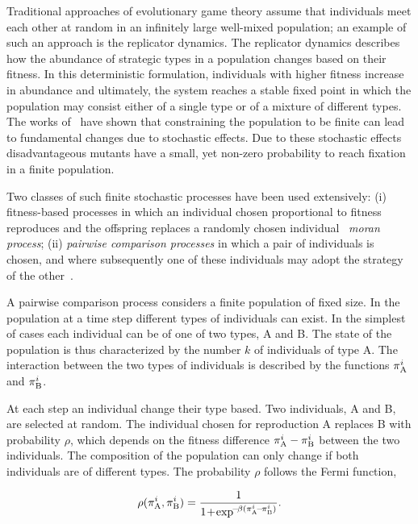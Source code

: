 \documentclass[11pt]{article}
\theoremstyle{plainCl1}
\theoremstyle{plainCl2}
\begin{document}
Traditional approaches of evolutionary game theory assume that individuals meet
each other at random in an infinitely large well-mixed population; an example of
such an approach is the replicator dynamics. The replicator dynamics describes
how the abundance of strategic types in a population changes based on their
fitness. In this deterministic formulation, individuals with higher fitness
increase in abundance and ultimately, the system reaches a stable fixed point in
which the population may consist either of a single type or of a mixture of
different types. The works of~\cite{nowak2004emergence, taylor2004evolutionary,
imhof2005evolutionary, imhof2006evolutionary, traulsen2007pairwise} have shown
that constraining the population to be finite can lead to fundamental changes
due to stochastic effects. Due to these stochastic effects disadvantageous
mutants have a small, yet non-zero probability to reach fixation in a finite
population.

Two classes of such finite stochastic processes have been used extensively: (i)
fitness-based processes in which an individual chosen proportional to fitness
reproduces and the offspring replaces a randomly chosen individual~\cite{nowak2004emergence}
\textit{moran process}; (ii) \textit{pairwise comparison processes} in which a
pair of individuals is chosen, and where subsequently one of these individuals
may adopt the strategy of the other~\cite{traulsen2007pairwise}.

A pairwise comparison process considers a finite population of fixed size. In
the population at a time step different types of individuals can exist. In the
simplest of cases each individual can be of one of two types, A and B. The state
of the population is thus characterized by the number \(k\) of individuals of
type A. The interaction between the two types of individuals is described by the
functions \(\pi _{{\rm A}}^{i}\) and $\pi _{{\rm B}}^{i}$.

At each step an individual change their type based. Two individuals, A and B,
are selected at random. The individual chosen for reproduction A replaces B with
probability \(\rho\), which depends on the fitness difference \(\pi _{{\rm
A}}^{i} - \pi _{{\rm B}}^{i}\) between the two individuals. The composition of
the population can only change if both individuals are of different types. The
probability \(\rho\) follows the Fermi function,

\begin{equation}
  \rho(\pi _{{\rm A}}^{i}, \pi _{{\rm B}}^{i}) = \frac{1}{1\!+\! \exp^{\!-\!\beta (\pi _{{\rm A}}^{i}\!-\!\pi _{{\rm B}}^{i})}}.
\end{equation}
\end{document}
